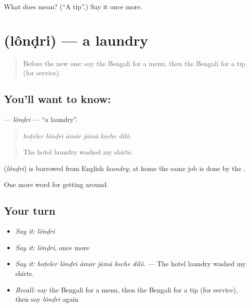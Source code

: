 \begin{tcolorbox}[breakable,colback=teal!4,colframe=teal!35!black,title={Before you move on}]
What does  mean? (\textquotedblleft{}A tip\textquotedblright{}.) Say it once more.
\end{tcolorbox}
\section[\texorpdfstring{\bn{লন্ড্রি} (lônḍri)}{লন্ড্রি (lônḍri)}]{ (lônḍri) — a laundry}

\label{lesson:BN-C407-londri}



\begin{quote}
Before the new one: say the Bengali for a menu, then the Bengali for a tip (for service).
\end{quote}

\subsection*{You'll want to know: }
\textbf{} — \emph{lônḍri} — \textquotedblleft{}a laundry\textquotedblright{}.

\begin{quote}
     
\end{quote}

\begin{quote}
\emph{hoṭeler lônḍri āmār jāmā keche dilô.}
\end{quote}

\begin{quote}
The hotel laundry washed my shirts.
\end{quote}

\begin{cousinweb}
\textbf{} (\emph{lônḍri}) is borrowed from English \emph{laundry}; at home the same job is done by the .
\end{cousinweb}

\begin{grammarlens}[title={What you've built}]
One more word for getting around.
\end{grammarlens}

\subsection*{Your turn}
\begin{itemize}
\raggedright
  \item \emph{Say it:} \emph{lônḍri}
  \item \emph{Say it:} \emph{lônḍri}, once more
  \item \emph{Say it:} \emph{hoṭeler lônḍri āmār jāmā keche dilô.} — The hotel laundry washed my shirts.
  \item \emph{Recall:} say the Bengali for a menu, then the Bengali for a tip (for service), then say \emph{lônḍri} again
\end{itemize}

